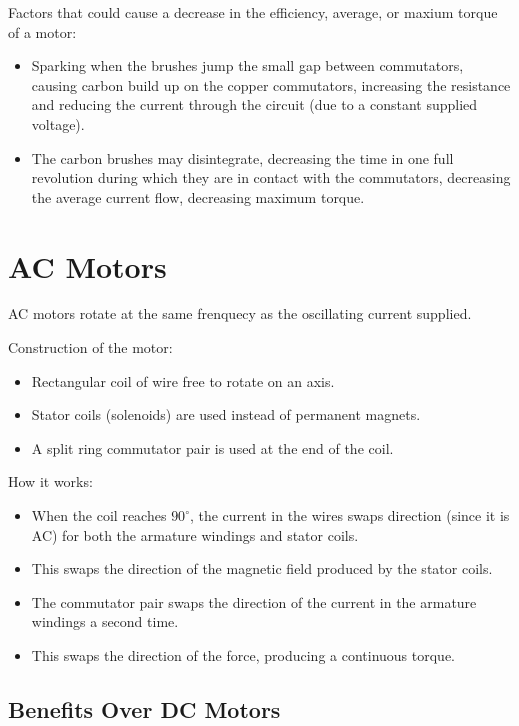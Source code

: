 \documentclass[a4paper,11pt]{article}
\begin{document}
Factors that could cause a decrease in the efficiency, average, or maxium
torque of a motor:

\begin{itemize}
\item Sparking when the brushes jump the small gap between commutators,
	causing carbon build up on the copper commutators, increasing the
	resistance and reducing the current through the circuit (due to a constant
	supplied voltage).
\item The carbon brushes may disintegrate, decreasing the time in one full
	revolution during which they are in contact with the commutators,
	decreasing the average current flow, decreasing maximum torque.
\end{itemize}




\section{AC Motors}

AC motors rotate at the same frenquecy as the oscillating current supplied.

Construction of the motor:

\begin{itemize}
\item Rectangular coil of wire free to rotate on an axis.
\item Stator coils (solenoids) are used instead of permanent magnets.
\item A split ring commutator pair is used at the end of the coil.
\end{itemize}

How it works:

\begin{itemize}
\item When the coil reaches $90^\circ$, the current in the wires swaps direction
	(since it is AC) for both the armature windings and stator coils.
\item This swaps the direction of the magnetic field produced by the stator
	coils.
\item The commutator pair swaps the direction of the current in the armature
	windings a second time.
\item This swaps the direction of the force, producing a continuous torque.
\end{itemize}


\subsection{Benefits Over DC Motors}
\end{document}

